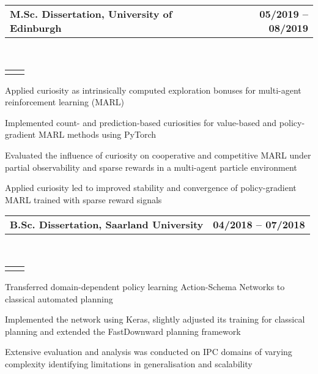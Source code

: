 \documentclass[]{lukas-cv}
\makeatletter
\newcommand{\headerrow}[2]
{\begin{tabular*}{\linewidth}{l@{\extracolsep{\fill}}r}
	\fontspec{Helvetica}\fontsize{12pt}{12pt}\selectfont\bfseries{\color{subheadings}#1} &
	\fontspec{Helvetica}\fontsize{12pt}{12pt}\selectfont\bfseries{\color{subheadings}#2} \\
\end{tabular*}}
\newcommand{\locationrow}[2]
{\begin{tabular*}{\linewidth}{l@{\extracolsep{\fill}}r}
        \color{headings}\scshape\fontspec{Heiti TC Medium}\fontsize{10pt}{12pt}\selectfont{#1}  &
        \color{headings}\scshape\fontspec{Heiti TC Medium}\fontsize{10pt}{12pt}\selectfont{#2}  \\
\end{tabular*}}
\makeatother
\begin{document}
\noindent
\headerrow{M.Sc. Dissertation, University of Edinburgh}{05/2019 -- 08/2019}
\\
\locationrow{Autonomous Agents Research Group}{}
\begin{tightitemize}{1.7em}
    \item Applied curiosity as intrinsically computed exploration bonuses for multi-agent reinforcement learning (MARL)
    \item Implemented count- and prediction-based curiosities for value-based and policy-gradient MARL methods using PyTorch
    \item Evaluated the influence of curiosity on cooperative and competitive MARL under partial observability and sparse rewards in a multi-agent particle environment
    \item Applied curiosity led to improved stability and convergence of policy-gradient MARL trained with sparse reward signals
\end{tightitemize}
\largesectionsep


\noindent
\headerrow{B.Sc. Dissertation, Saarland University}{04/2018 -- 07/2018}
\\
\locationrow{Foundations of Artificial Intelligence (FAI) Group}{}
\begin{tightitemize}{1.7em}
    \item Transferred domain-dependent policy learning Action-Schema Networks to
    classical automated planning
    \item Implemented the network using Keras, slightly adjusted its training for classical planning and extended 
    the FastDownward planning framework
    \item Extensive evaluation and analysis was conducted on IPC domains of varying complexity identifying
    limitations in generalisation and scalability
\end{tightitemize}
\largesectionsep
\end{document}
